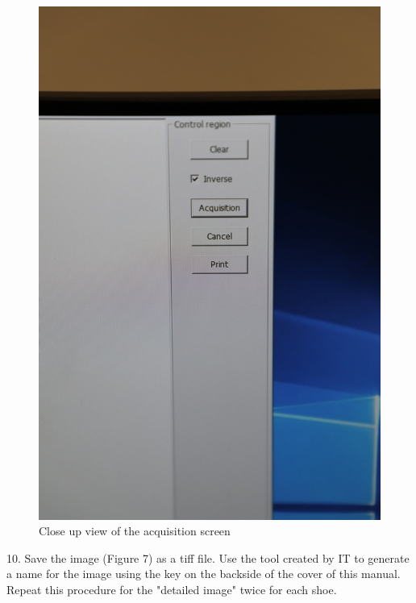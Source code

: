 \begin{figure}[!htp]
\centering
\includegraphics[scale=0.2]{2D_Screen_2}
\caption{Close up view of the acquisition screen}
\label{Image 6}
\end{figure}

\newpage

10. Save the image (Figure 7) as a tiff file. Use the tool created by IT to generate a name for the image using the key on the backside of the cover of this manual. Repeat this procedure for the "detailed image" twice for each shoe. 


